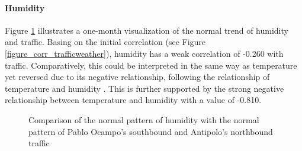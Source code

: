 
\paragraph{Humidity}

Figure \ref{figure_traffic_vs_humidity} illustrates a one-month visualization of the normal trend of humidity and traffic. Basing on the initial correlation (see Figure \ref{figure_corr_trafficweather}), humidity has a weak correlation of -0.260 with traffic. Comparatively, this could be interpreted in the same way as temperature yet reversed due to its negative relationship, following the relationship of temperature and humidity . This is further supported by the strong negative relationship between temperature and humidity with a value of -0.810.

\begin{figure}[!t] 
\centering
    \centering
      \captionsetup{justification=centering}
    \hfill
    \caption{Comparison of the normal pattern of humidity with the normal pattern of Pablo Ocampo’s southbound and Antipolo’s northbound traffic}

    \label{figure_traffic_vs_humidity}
\end{figure}

